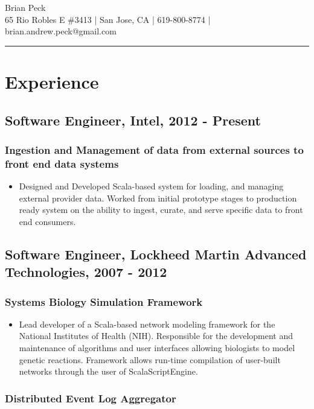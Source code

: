 \documentclass[11pt]{article}
\title{}
\date{}
\begin{document}
\begin{center}
{\huge Brian Peck} \\
65 Rio Robles E \#3413 | San Jose, CA | 619-800-8774 | brian.andrew.peck@gmail.com
\hrule
\end{center}

\section*{Experience}
\label{sec-1}

\subsection*{Software Engineer, Intel, 2012 - Present}
\label{sec-1.1}

\subsubsection*{Ingestion and Management of data from external sources to front end data systems}
\label{sec-1.1.1}

\begin{itemize}
\item Designed and Developed Scala-based system for loading, and managing external provider data. Worked from initial prototype stages to production ready system on the ability to ingest, curate, and serve specific data to front end consumers.
\end{itemize}
\subsection*{Software Engineer, Lockheed Martin Advanced Technologies, 2007 - 2012}
\label{sec-1.2}

\subsubsection*{Systems Biology Simulation Framework}
\label{sec-1.2.1}

\begin{itemize}
\item Lead developer of a Scala-based network modeling framework for the National Institutes of Health (NIH). Responsible for the development and maintenance of algorithms and user interfaces allowing biologists to model genetic reactions. Framework allows run-time compilation of user-built networks through the user of ScalaScriptEngine.
\end{itemize}
\subsubsection*{Distributed Event Log Aggregator}
\label{sec-1.2.2}
\end{document}
